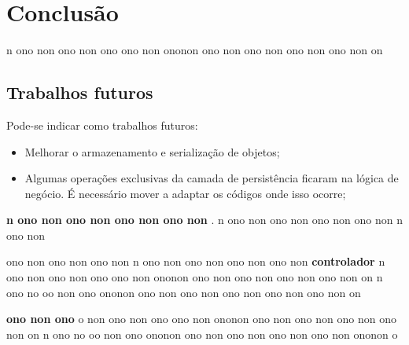 \chapter{Conclusão} \label{cap:conclusao}

n ono non ono non ono ono non ononon ono non ono non ono non ono non on

\section{Trabalhos futuros}

Pode-se indicar como trabalhos futuros:

\begin{itemize}
  \item{Melhorar o armazenamento e serialização de objetos;}
  \item{Algumas operações exclusivas da camada de persistência ficaram na lógica de negócio. É necessário mover a adaptar os códigos onde isso ocorre;}
\end{itemize}

\textbf{n ono non ono non ono non ono non }.
n ono non ono non ono non ono non n ono non 

ono non ono non ono non n ono non ono non ono non ono non 
\textbf{controlador} n ono non ono non ono ono non ononon ono non ono non ono non ono non on
n ono no oo non ono ononon ono  non ono non ono non ono non ono non on

\textbf{ono non ono}
o non ono non ono ono non ononon ono non ono non ono non ono non on
n ono no oo non ono ononon ono  non ono non ono non ono non ononon o 

